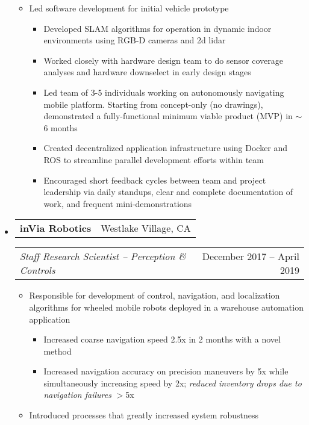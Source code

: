 \documentclass[letterpaper,18pt]{article}
\makeatletter
\newcommand{\resitem}[1]{\item #1 \vspace{-2pt}}
\newcommand{\headerrow}[2]{%
  \hspace*{-\labelsep}%
  \begin{tabular*}{\dimexpr\linewidth+\labelsep}{@{\extracolsep{\fill}}lr@{}}
    #1 &
    #2 \\
  \end{tabular*}%
}
\makeatother
\begin{document}
\begin{itemize}[label={},leftmargin=*,noitemsep]
{\begin{itemize}[noitemsep]
\begin{itemize}[noitemsep]
                \resitem{Worked with external recruiters to identify screening criteria for candidates}
                \resitem{Conducted $\sim$90\% of interviews initially, including technical panel interviews for hardware team candidates, but was able to delegate much of this responsibility as the team grew.}
                \resitem{Grew the team from 1 to 12+ in 8 months.  Total team, including hardware and industrial design, grew to 35+}
        \end{itemize}
        \resitem{Led software development for initial vehicle prototype}
        \begin{itemize}[noitemsep]
                \resitem{Developed SLAM algorithms for operation in dynamic indoor environments using RGB-D cameras and 2d lidar}
                \resitem{Worked closely with hardware design team to do sensor coverage analyses and hardware downselect in early design stages}
                \resitem{Led team of 3-5 individuals working on autonomously navigating mobile platform.  Starting from concept-only (no drawings), demonstrated a fully-functional minimum viable product (MVP) in $\sim$6 months}
		        \resitem{Created decentralized application infrastructure using Docker and ROS to streamline parallel development efforts within team}
		        \resitem{Encouraged short feedback cycles between team and project leadership via daily standups, clear and complete documentation of work, and frequent mini-demonstrations}
        \end{itemize}
	\end{itemize}
	}
\item
	\headerrow{\textbf{inVia Robotics}}{Westlake Village, CA}
	\headerrow{\emph{Staff Research Scientist -- Perception \& Controls}}{December 2017 -- April 2019}
	{\small
	\begin{itemize}[noitemsep]
		\resitem{Responsible for development of control, navigation, and localization algorithms for wheeled mobile robots deployed in a warehouse automation application}
        \begin{itemize}[noitemsep]
                \resitem{Increased coarse navigation speed 2.5x in 2 months with a novel method}
                \resitem{Increased navigation accuracy on precision maneuvers by 5x while simultaneously increasing speed by 2x; \textit{reduced inventory drops due to navigation failures} $>$5x}
        \end{itemize}
\newpage
		\resitem{Introduced processes that greatly increased system robustness}

\end{itemize}}
\end{itemize}
\end{document}
